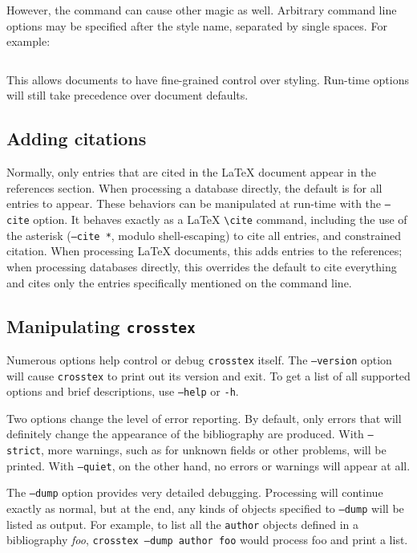 \documentclass{article}
\begin{document}
However, the \verb"" command can cause other magic as
well. Arbitrary command line options may be specified after the style
name, separated by single spaces. For example:

\begin{small}\begin{verbatim}

\end{verbatim}\end{small}

This allows documents to have fine-grained control over styling. Run-time
options will still take precedence over document defaults.

\subsection{Adding citations}

Normally, only entries that are cited in the \LaTeX{} document appear
in the references section.  When processing a database directly,
the default is for all entries to appear.  These behaviors can be
manipulated at run-time with the \texttt{--cite} option.  It behaves
exactly as a \LaTeX{} \verb"\cite" command, including the use of the
asterisk (\texttt{--cite *}, modulo shell-escaping) to cite all entries,
and constrained citation.  When processing \LaTeX{} documents, this
adds entries to the references; when processing databases directly,
this overrides the default to cite everything and cites only the entries
specifically mentioned on the command line.

\subsection{Manipulating \texttt{crosstex}}

Numerous options help control or debug \texttt{crosstex} itself.  The
\texttt{--version} option will cause \texttt{crosstex} to print out its
version and exit.  To get a list of all supported options and brief
descriptions, use \texttt{--help} or \texttt{-h}.

Two options change the level of error reporting.  By default, only
errors that will definitely change the appearance of the bibliography
are produced.  With \texttt{--strict}, more warnings, such as for unknown
fields or other problems, will be printed.  With \texttt{--quiet}, on the
other hand, no errors or warnings will appear at all.

The \texttt{--dump} option provides very detailed debugging.  Processing
will continue exactly as normal, but at the end, any kinds of objects
specified to \texttt{--dump} will be listed as output.  For example, to
list all the \texttt{author} objects defined in a bibliography \textit{foo},
\texttt{crosstex --dump author foo} would process foo and print a list.
\end{document}
